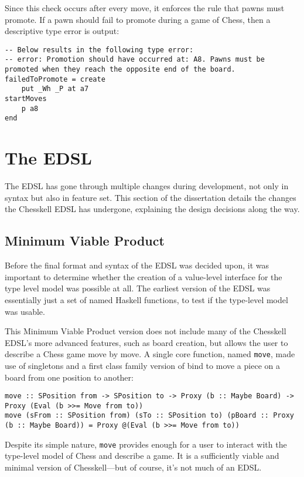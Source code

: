 \documentclass[12pt, a4paper, bibliography=totocnumbered]{scrreprt}
\newcommand{\inline}[1]{\lstinline[basicstyle=\ttfamily\footnotesize]{#1}}
\begin{document}
Since this check occurs after every move, it enforces the rule that pawns must promote. If a pawn should fail to promote during a game of Chess, then a descriptive type error is output:

\begin{lstlisting}
-- Below results in the following type error:
-- error: Promotion should have occurred at: A8. Pawns must be promoted when they reach the opposite end of the board.
failedToPromote = create
    put _Wh _P at a7
startMoves
    p a8
end
\end{lstlisting}

\section{The EDSL}

The EDSL has gone through multiple changes during development, not only in syntax but also in feature set. This section of the dissertation details the changes the Chesskell EDSL has undergone, explaining the design decisions along the way.

\subsection{Minimum Viable Product}

Before the final format and syntax of the EDSL was decided upon, it was important to determine whether the creation of a value-level interface for the type level model was possible at all. The earliest version of the EDSL was essentially just a set of named Haskell functions, to test if the type-level model was usable.

This Minimum Viable Product version does not include many of the Chesskell EDSL's more advanced features, such as board creation, but allows the user to describe a Chess game move by move. A single core function, named \inline{move}, made use of singletons and a first class family version of bind to move a piece on a board from one position to another:

\begin{lstlisting}
move :: SPosition from -> SPosition to -> Proxy (b :: Maybe Board) -> Proxy (Eval (b >>= Move from to))
move (sFrom :: SPosition from) (sTo :: SPosition to) (pBoard :: Proxy (b :: Maybe Board)) = Proxy @(Eval (b >>= Move from to))
\end{lstlisting}

Despite its simple nature, \inline{move} provides enough for a user to interact with the type-level model of Chess and describe a game. It is a sufficiently viable and minimal version of Chesskell---but of course, it's not much of an EDSL.
\end{document}
